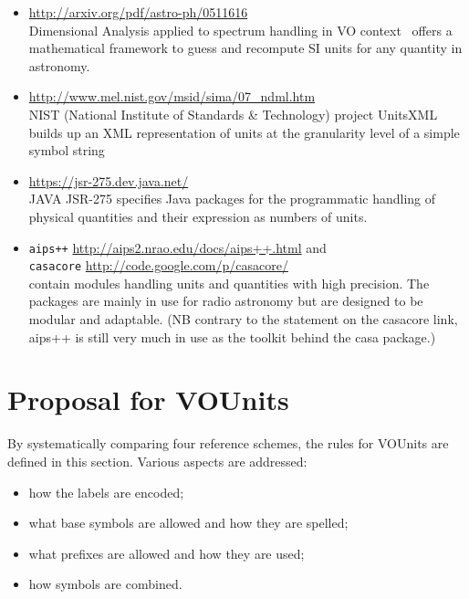 \documentclass[12pt,notitlepage,onecolumn]{ivoa}
\newcommand{\violet}{\textcolor[rgb]{0.50,0.00,0.50}}
\begin{document}
\begin{itemize}
\item
\violet{\footnotesize{\url{http://arxiv.org/pdf/astro-ph/0511616}}}\\ 
Dimensional Analysis applied to spectrum handling in VO context~\citep{osuna05}
offers a mathematical framework to guess and recompute
SI units for any quantity in astronomy.
\item
\violet{\footnotesize{\url{http://www.mel.nist.gov/msid/sima/07_ndml.htm}}}\\
NIST (National Institute of Standards \& Technology) project
UnitsXML builds up an XML representation of units at the granularity
level of a simple symbol string
\item \violet{\footnotesize{\url{https://jsr-275.dev.java.net/}}}\\
JAVA JSR-275 specifies Java packages for the programmatic
handling of physical quantities and their expression as numbers of
units.
\item  \texttt{aips++}
\violet{\footnotesize{\url{http://aips2.nrao.edu/docs/aips++.html}}} and\\
 \texttt{casacore} \violet{\footnotesize{\url{http://code.google.com/p/casacore/}}}\\ contain modules handling units and
quantities with high precision. The packages are mainly in use for
radio astronomy but are designed to be modular and adaptable.  (NB
contrary to the statement on the casacore link, aips++ is still very much in
use as the toolkit behind the {\sc casa} package.)
\end{itemize}

\section{Proposal for VOUnits\label{sec:proposal}}

By systematically comparing four reference schemes, the rules for VOUnits are defined in this section.
Various aspects are addressed:
\begin{itemize}
\item how the labels are encoded;
\item what base symbols are allowed and how they are spelled;
\item what prefixes are allowed and how they are used;
\item how symbols are combined.
\end{itemize}
\end{document}
